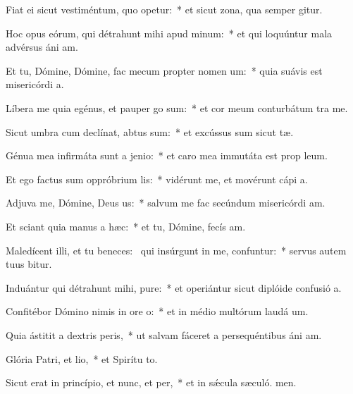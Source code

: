 \item Fiat ei sicut vestiméntum, quo opetur:~* et sicut zona, qua semper gitur.
\item Hoc opus eórum, qui détrahunt mihi apud minum:~* et qui loquúntur mala advérsus áni am.
\item Et tu, Dómine, Dómine, fac mecum propter nomen um:~* quia suávis est misericórdi a.
\item Líbera me quia egénus, et pauper go sum:~* et cor meum conturbátum  tra me.
\item Sicut umbra cum declínat, abtus sum:~* et excússus sum sicut tæ.
\item Génua mea infirmáta sunt a jenio:~* et caro mea immutáta est prop leum.
\item Et ego factus sum oppróbrium lis:~* vidérunt me, et movérunt cápi a.
\item Adjuva me, Dómine, Deus us:~* salvum me fac secúndum misericórdi am.
\item Et sciant quia manus a hæc:~* et tu, Dómine, fecís am.
\item Maledícent illi, et tu beneces:~\pscross{} qui insúrgunt in me, confuntur:~* servus autem tuus bitur.
\item Induántur qui détrahunt mihi, pure:~* et operiántur sicut diplóide confusió a.
\item Confitébor Dómino nimis in ore o:~* et in médio multórum laudá um.
\item Quia ástitit a dextris peris,~* ut salvam fáceret a persequéntibus áni am.
\item Glória Patri, et lio,~* et Spirítu to.
\item Sicut erat in princípio, et nunc, et per,~* et in sǽcula sæculó. men.
